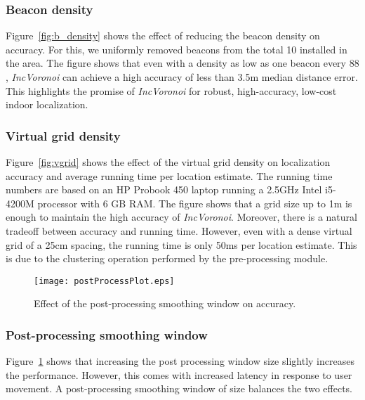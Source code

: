 \documentclass[conference]{IEEEtran}
\def \sys {\textit{IncVoronoi}}
\begin{document}
\subsubsection{Beacon density}
Figure~\ref{fig:b_density} shows the effect of reducing the beacon density on accuracy. For this, we uniformly removed beacons from the total 10 installed in the area. The figure shows that even with a density as low as one beacon every 88 , \sys{} can achieve a high accuracy of  less than 3.5m median distance error.
This highlights the promise of \sys{} for robust, high-accuracy, low-cost indoor localization. 

\subsubsection{Virtual grid density}
Figure~\ref{fig:vgrid} shows the effect of the virtual grid density on localization accuracy and average running time per location estimate.  The running time numbers are based on an HP Probook 450 laptop running a 2.5GHz Intel i5-4200M processor with 6 GB RAM. The figure shows that a grid size up to 1m is enough to maintain the high accuracy of \sys{}. Moreover, there is a natural tradeoff between accuracy and running time. However, even with a dense virtual grid of a 25cm spacing, the running time is only 50ms per location estimate. This is due to the clustering operation performed by the pre-processing module. 

\begin{figure}[!t]
\centering
\texttt{[image: postProcessPlot.eps]}
\caption{Effect of the post-processing smoothing window on accuracy.}
\label{fig:postproc}
\end{figure}
\subsubsection{Post-processing smoothing window}
Figure~\ref{fig:postproc} shows that increasing the post processing window size slightly increases the performance. However, this comes with increased latency in response to user movement. A post-processing smoothing window of size  balances the two effects.
\end{document}
